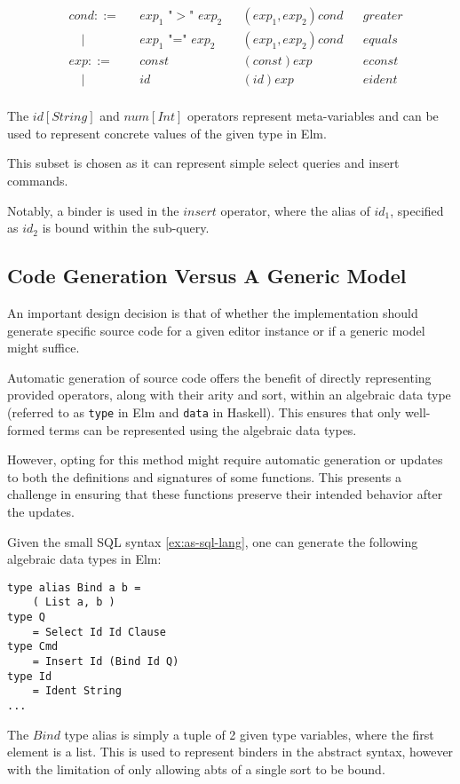 \documentclass[sigplan]{acmart}
\newcommand{\abt}{\textsf{abt}\xspace}
\begin{document}
\begin{example}
\[\begin{aligned}
       & cond ::=    &  & \text{$exp_1$ "$>$" $exp_2$}    &   & (exp_1,exp_2)cond       &  & greater         \\
       & \quad |     &  & \text{$exp_1$ "=" $exp_2$}      &   & (exp_1,exp_2)cond       &  & equals          \\
       & exp ::=     &  & \text{$const$}                  &   & (const)exp              &  & econst          \\
       & \quad |     &  & \text{$id$}                     &   & (id)exp                 &  & eident          \\
    \end{aligned}
  \]


  The $id[String]$ and $num[Int]$ operators represent meta-variables and can be used to represent concrete values of the given type in Elm.

  This subset is chosen as it can represent simple select queries and insert commands.

  Notably, a binder is used in the $insert$ operator, where the alias of $id_1$, specified as $id_2$ is bound within the sub-query.
\end{example}

\subsection{Code Generation Versus A Generic Model}

An important design decision is that of whether the implementation
should generate specific source code for a given editor instance or if a
generic model might suffice.

Automatic generation of source code offers the benefit of directly
representing provided operators, along with their arity and sort,
within an algebraic data type (referred to as \texttt{type} in Elm and
\texttt{data} in Haskell).  This ensures that only well-formed terms
can be represented using the algebraic data types.

However, opting for this method might require automatic generation or
updates to both the definitions and signatures of some functions.
This presents a challenge in ensuring that these functions preserve
their intended behavior after the updates.

\begin{example}\label{ex:sql-data-types}
  Given the small SQL syntax \cref{ex:as-sql-lang}, one can generate the following algebraic data types in Elm:
  \begin{lstlisting}[style=examplestyle]
type alias Bind a b =
    ( List a, b )
type Q
    = Select Id Id Clause
type Cmd
    = Insert Id (Bind Id Q)
type Id
    = Ident String
...
\end{lstlisting}

  The $Bind$ type alias is simply a tuple of 2 given type variables,
  where the first element is a list. This is used to represent binders in the
  abstract syntax, however with the limitation of only allowing {\abt}s of a single
  sort to be bound.
\end{example}
\end{document}
